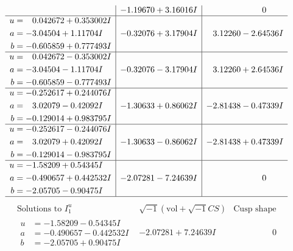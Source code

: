 \documentclass[1p]{elsarticle_modified}
\theoremstyle{definition}
\newcommand{\I}{\sqrt{-1}}
\begin{document}
$$\begin{array}{c|c|c}
 & -1.19670 + 3.16016 I & \phantom{-0.000000 } 0 \\ \hline\begin{aligned}
u &= \phantom{-}0.042672 + 0.353002 I \\
a &= -3.04504 + 1.11704 I \\
b &= -0.605859 + 0.777493 I\end{aligned}
 & -0.32076 + 3.17904 I & \phantom{-}3.12260 - 2.64536 I \\ \hline\begin{aligned}
u &= \phantom{-}0.042672 - 0.353002 I \\
a &= -3.04504 - 1.11704 I \\
b &= -0.605859 - 0.777493 I\end{aligned}
 & -0.32076 - 3.17904 I & \phantom{-}3.12260 + 2.64536 I \\ \hline\begin{aligned}
u &= -0.252617 + 0.244076 I \\
a &= \phantom{-}3.02079 - 0.42092 I \\
b &= -0.129014 + 0.983795 I\end{aligned}
 & -1.30633 + 0.86062 I & -2.81438 - 0.47339 I \\ \hline\begin{aligned}
u &= -0.252617 - 0.244076 I \\
a &= \phantom{-}3.02079 + 0.42092 I \\
b &= -0.129014 - 0.983795 I\end{aligned}
 & -1.30633 - 0.86062 I & -2.81438 + 0.47339 I \\ \hline\begin{aligned}
u &= -1.58209 + 0.54345 I \\
a &= -0.490657 + 0.442532 I \\
b &= -2.05705 - 0.90475 I\end{aligned}
 & -2.07281 - 7.24639 I & \phantom{-0.000000 } 0\\
 \hline 
 \end{array}$$\newpage$$\begin{array}{c|c|c}  
\text{Solutions to }I^u_{1}& \I (\text{vol} + \sqrt{-1}CS) & \text{Cusp shape}\\
 \hline 
\begin{aligned}
u &= -1.58209 - 0.54345 I \\
a &= -0.490657 - 0.442532 I \\
b &= -2.05705 + 0.90475 I\end{aligned}
 & -2.07281 + 7.24639 I & \phantom{-0.000000 } 0 \\ \hline\begin{aligned}

\end{aligned}
\end{array}$$
\end{document}
